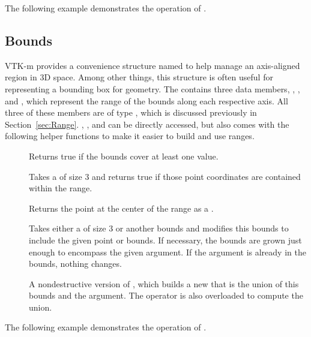 The following example demonstrates the operation of .


\subsection{Bounds}
\label{sec:Bounds}

VTK-m provides a convenience structure named  to help manage
an axis-aligned region in 3D space. Among other things, this structure is
often useful for representing a bounding box for geometry. The
  contains three data members,
, , and , which represent the range of
the bounds along each respective axis. All three of these members are of
type , which is discussed previously in
Section~\ref{sec:Range}. , , and  can
be directly accessed, but  also comes with the
following helper functions to make it easier to build and use ranges.

\begin{description}
\item[] Returns true if the bounds cover at least one
  value.
\item[] Takes a  of size 3 and returns true if
  those point coordinates are contained within the range.
\item[] Returns the point at the center of the range as a
  \textcode{<}.
\item[] Takes either a  of size 3 or another
  bounds and modifies this bounds to include the given point or bounds. If
  necessary, the bounds are grown just enough to encompass the given
  argument. If the argument is already in the bounds, nothing changes.
\item[] A nondestructive version of ,
  which builds a new  that is the union of this
  bounds and the argument. The \textcode{+} operator is also overloaded to
  compute the union.
\end{description}

The following example demonstrates the operation of .



